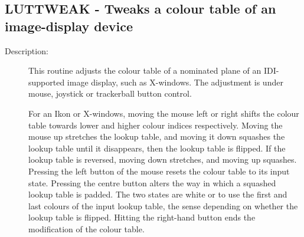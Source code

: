 \documentclass[twoside,11pt]{article}
\newcommand{\stardocinitials}  {SUN}
\newcommand{\stardocnumber}    {239.2}
\newcommand{\stardocname}{\stardocinitials /\stardocnumber}
\newcommand{\xlabel}[1]{}
\newlength{\sstbannerlength}
\newlength{\sstcaptionlength}
\newlength{\sstexampleslength}
\newlength{\sstexampleswidth}
\newcommand{\sstroutine}[3]{
   \goodbreak
   \markboth{{\stardocname}~ --- #1}{{\stardocname}~ --- #1}
   \rule{\textwidth}{0.5mm}
   \vspace{-7ex}
   \newline
   \settowidth{\sstbannerlength}{{\Large {\bf #1}}}
   \setlength{\sstcaptionlength}{\textwidth}
   \setlength{\sstexampleslength}{\textwidth}
   \addtolength{\sstbannerlength}{0.5em}
   \addtolength{\sstcaptionlength}{-2.0\sstbannerlength}
   \addtolength{\sstcaptionlength}{-4.9pt}
   \settowidth{\sstexampleswidth}{{\bf Examples:}}
   \addtolength{\sstexampleslength}{-\sstexampleswidth}
   \parbox[t]{\sstbannerlength}{\flushleft{\Large {\bf #1}}}
   \parbox[t]{\sstcaptionlength}{\center{\Large #2}}
   \parbox[t]{\sstbannerlength}{\flushright{\Large {\bf #1}}}
   \begin{description}
      #3
   \end{description}
}
\newcommand{\sstdescription}[1]{\item[Description:] #1}
\renewcommand{\sstroutine}[3]{
      \subsection{#1\xlabel{#1}-\label{#1}#2}
      \begin{description}
         #3
      \end{description}
   }
\renewcommand{\sstdescription}[1]{\item[Description:]
      \begin{description}
         #1
      \end{description}
   }
\begin{document}
\sstroutine{
   LUTTWEAK
}{
   Tweaks a colour table of an image-display device
}{
   \sstdescription{
      This routine adjusts the colour table of a nominated plane of
      an IDI-supported image display, such as X-windows.  The adjustment
      is under mouse, joystick or trackerball button control.

      For an Ikon or X-windows, moving the mouse left or right shifts
      the colour table towards lower and higher colour indices
      respectively.  Moving the mouse up stretches the lookup table,
      and moving it down squashes the lookup table until it disappears,
      then the lookup table is flipped.  If the lookup table is
      reversed, moving down stretches, and moving up squashes.
      Pressing the left button of the mouse resets the colour table to
      its input state.  Pressing the centre button alters the way in
      which a squashed lookup table is padded.  The two states are
      white or to use the first and last colours of the input lookup
      table, the sense depending on whether the lookup table is
      flipped.  Hitting the right-hand button ends the modification of
      the colour table.

}}
\end{document}

